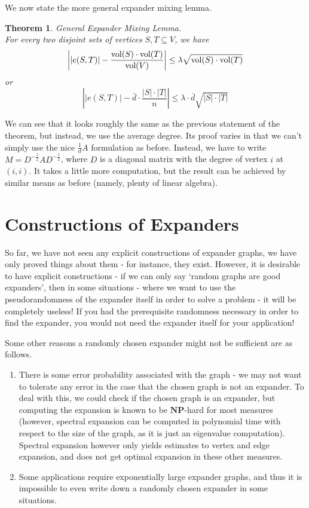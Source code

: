 \documentclass[11pt]{article}
\newtheorem{theorem}{Theorem}[section]
\theoremstyle{definition}
\theoremstyle{definition}
\theoremstyle{definition}
\newcommand{\txt}[1]
{\textnormal{#1}}
\begin{document}
We now state the more general expander mixing lemma. 
\begin{theorem} General Expander Mixing Lemma. \\
For every two disjoint sets of vertices $S, T \subseteq V$, we have 
\[
\left| |e(S, T)| - \frac{\txt{vol}(S)\cdot \txt{vol}(T)}{\txt{vol}(V)} \right| \leq \lambda \sqrt{\txt{vol}(S) \cdot \txt{vol}(T)}
\]
or 
\[
\left| |e(S, T)| - \bar{d} \cdot\frac{|S|\cdot |T|}{n} \right| \leq \lambda\cdot\bar{d} \sqrt{|S| \cdot |T|}
\]
\end{theorem}
We can see that it looks roughly the same as the previous statement of the theorem, but instead, we use the average degree.
Its proof varies in that we can't simply use the nice $\frac{1}{d}A$ formulation as before. Instead, we have to write $M = D^{-\frac{1}{2}}AD^{-\frac{1}{2}}$, where $D$ is a diagonal matrix with the degree of vertex $i$ at $(i, i)$. It takes a little more computation, but the result can be achieved by similar means as before (namely, plenty of linear algebra). 

\section{Constructions of Expanders}

So far, we have not seen any explicit constructions of expander graphs, we have only proved things about them - for instance, they exist. However, it is desirable to have explicit constructions - if we can only say `random graphs are good expanders', then in some situations - where we want to use the pseudorandomness of the expander itself in order to solve a problem - it will be completely useless! If you had the prerequisite randomness necessary in order to find the expander, you would not need the expander itself for your application!

Some other reasons a randomly chosen expander might not be sufficient are as follows. 

\begin{enumerate}

\item There is some error probability associated with the graph - we may not want to tolerate any error in the case that the chosen graph is not an expander. To deal with this, we could check if the chosen graph is an expander, but computing the expansion is known to be $\textbf{NP}$-hard for most measures (however, spectral expansion can be computed in polynomial time with respect to the size of the graph, as it is just an eigenvalue computation). Spectral expansion however only yields estimates to vertex and edge expansion, and does not get optimal expansion in these other measures. 

\item Some applications require exponentially large expander graphs, and thus it is impossible to even write down a randomly chosen expander in some situations.

\end{enumerate}
\end{document}
